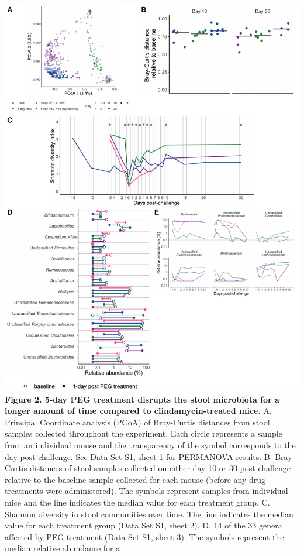 \documentclass[
  11pt,
]{article}
\begin{document}
\includegraphics{figure_2.pdf} \textbf{Figure 2. 5-day PEG treatment
disrupts the stool microbiota for a longer amount of time compared to
clindamycin-treated mice.} A. Principal Coordinate analysis (PCoA) of
Bray-Curtis distances from stool samples collected throughout the
experiment. Each circle represents a sample from an individual mouse and
the transparency of the symbol corresponds to the day post-challenge.
See Data Set S1, sheet 1 for PERMANOVA results. B. Bray-Curtis distances
of stool samples collected on either day 10 or 30 post-challenge
relative to the baseline sample collected for each mouse (before any
drug treatments were administered). The symbols represent samples from
individual mice and the line indicates the median value for each
treatment group. C. Shannon diversity in stool communities over time.
The line indicates the median value for each treatment group (Data Set
S1, sheet 2). D. 14 of the 33 genera affected by PEG treatment (Data Set
S1, sheet 3). The symbols represent the median relative abundance for a
\end{document}
